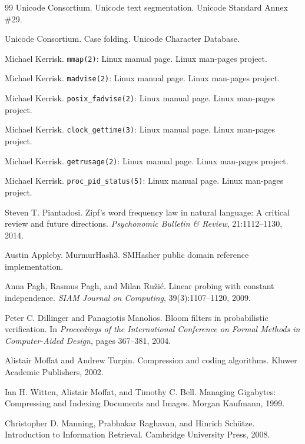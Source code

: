 \documentclass[11pt,a4paper]{article}
\begin{document}
\begin{thebibliography}{99}
Unicode Consortium.
\newblock Unicode text segmentation.
\newblock Unicode Standard Annex \#29.

Unicode Consortium.
\newblock Case folding.
\newblock Unicode Character Database.

Michael Kerrisk.
\newblock \texttt{mmap(2)}: Linux manual page.
\newblock Linux man-pages project.

Michael Kerrisk.
\newblock \texttt{madvise(2)}: Linux manual page.
\newblock Linux man-pages project.

Michael Kerrisk.
\newblock \texttt{posix\_fadvise(2)}: Linux manual page.
\newblock Linux man-pages project.

Michael Kerrisk.
\newblock \texttt{clock\_gettime(3)}: Linux manual page.
\newblock Linux man-pages project.

Michael Kerrisk.
\newblock \texttt{getrusage(2)}: Linux manual page.
\newblock Linux man-pages project.

Michael Kerrisk.
\newblock \texttt{proc\_pid\_status(5)}: Linux manual page.
\newblock Linux man-pages project.

Steven T. Piantadosi.
\newblock Zipf's word frequency law in natural language: A critical review and future directions.
\newblock \emph{Psychonomic Bulletin \& Review}, 21:1112--1130, 2014.

Austin Appleby.
\newblock MurmurHash3.
\newblock SMHasher public domain reference implementation.

Anna Pagh, Rasmus Pagh, and Milan Ru\v{z}i\'c.
\newblock Linear probing with constant independence.
\newblock \emph{SIAM Journal on Computing}, 39(3):1107--1120, 2009.

Peter C. Dillinger and Panagiotis Manolios.
\newblock Bloom filters in probabilistic verification.
\newblock In \emph{Proceedings of the International Conference on Formal Methods in Computer-Aided Design}, pages 367--381, 2004.

Alistair Moffat and Andrew Turpin.
\newblock Compression and coding algorithms.
\newblock Kluwer Academic Publishers, 2002.

Ian H. Witten, Alistair Moffat, and Timothy C. Bell.
\newblock Managing Gigabytes: Compressing and Indexing Documents and Images.
\newblock Morgan Kaufmann, 1999.

Christopher D. Manning, Prabhakar Raghavan, and Hinrich Sch\"utze.
\newblock Introduction to Information Retrieval.
\newblock Cambridge University Press, 2008.

\end{thebibliography}
\end{document}
